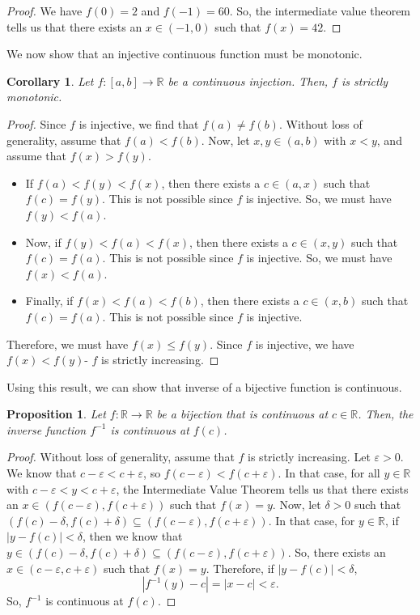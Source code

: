 \documentclass[a4paper, openany]{memoir}
\theoremstyle{definition}
\theoremstyle{plain}
\newtheorem{proposition}[definition]{Proposition}
\newtheorem{corollary}[definition]{Corollary}
\begin{document}
\begin{proof}
We have $f(0) = 2$ and $f(-1) = 60$. So, the intermediate value theorem tells us that there exists an $x \in (-1, 0)$ such that $f(x) = 42$.
\end{proof}
\noindent We now show that an injective continuous function must be monotonic.
\begin{corollary}
Let $f: [a, b] \to \mathbb{R}$ be a continuous injection. Then, $f$ is strictly monotonic.
\end{corollary}
\begin{proof}
Since $f$ is injective, we find that $f(a) \neq f(b)$. Without loss of generality, assume that $f(a) < f(b)$. Now, let $x, y \in (a, b)$ with $x < y$, and assume that $f(x) > f(y)$. 
\begin{itemize}
    \item If $f(a) < f(y) < f(x)$, then there exists a $c \in (a, x)$ such that $f(c) = f(y)$. This is not possible since $f$ is injective. So, we must have $f(y) < f(a)$.
    \item Now, if $f(y) < f(a) < f(x)$, then there exists a $c \in (x, y)$ such that $f(c) = f(a)$. This is not possible since $f$ is injective. So, we must have $f(x) < f(a)$.
    \item Finally, if $f(x) < f(a) < f(b)$, then there exists a $c \in (x, b)$ such that $f(c) = f(a)$. This is not possible since $f$ is injective.
\end{itemize}
Therefore, we must have $f(x) \leqslant f(y)$. Since $f$ is injective, we have $f(x) < f(y)$- $f$ is strictly increasing.
\end{proof}

\noindent Using this result, we can show that inverse of a bijective function is continuous.
\begin{proposition}
Let $f: \mathbb{R} \to \mathbb{R}$ be a bijection that is continuous at $c \in \mathbb{R}$. Then, the inverse function $f^{-1}$ is continuous at $f(c)$.
\end{proposition}
\begin{proof}
Without loss of generality, assume that $f$ is strictly increasing. Let $\varepsilon > 0$. We know that $c - \varepsilon < c + \varepsilon$, so $f(c - \varepsilon) < f(c + \varepsilon)$. In that case, for all $y \in \mathbb{R}$ with $c - \varepsilon < y < c + \varepsilon$, the Intermediate Value Theorem tells us that there exists an $x \in (f(c - \varepsilon), f(c + \varepsilon))$ such that $f(x) = y$. Now, let $\delta > 0$ such that $(f(c) - \delta, f(c) + \delta) \subseteq (f(c - \varepsilon), f(c + \varepsilon))$. In that case, for $y \in \mathbb{R}$, if $|y - f(c)| < \delta$, then we know that $y \in (f(c) - \delta, f(c) + \delta) \subseteq (f(c - \varepsilon) , f(c + \varepsilon))$. So, there exists an $x \in (c - \varepsilon, c + \varepsilon)$ such that $f(x) = y$. Therefore, if $|y - f(c)| < \delta$,
\[|f^{-1}(y) - c| = |x - c| < \varepsilon.\]
So, $f^{-1}$ is continuous at $f(c)$.
\end{proof}
\end{document}
